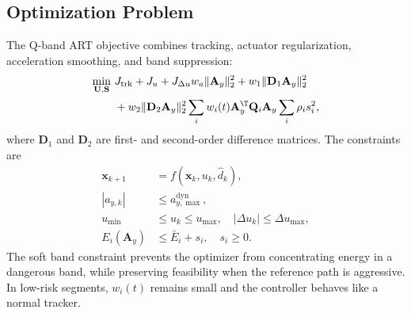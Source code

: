 \subsection{Optimization Problem}
The Q-band ART objective combines tracking, actuator regularization, acceleration smoothing, and band suppression:
\begin{equation}
\begin{aligned}
\min_{\mathbf{U},\mathbf{S}}~&
J_{\mathrm{trk}}+J_u+J_{\Delta u}
w_a\|\mathbf{A}_y\|_2^2+w_1\|\mathbf{D}_1\mathbf{A}_y\|_2^2\\
&+w_2\|\mathbf{D}_2\mathbf{A}_y\|_2^2
\sum_i w_i(t)\mathbf{A}_y^\T\mathbf{Q}_i\mathbf{A}_y
\sum_i\rho_i s_i^2 ,
\end{aligned}
\label{eq:qband_cost}
\end{equation}
where $\mathbf{D}_1$ and $\mathbf{D}_2$ are first- and second-order difference matrices. The constraints are
\begin{equation}
\begin{aligned}
    \mathbf{x}_{k+1}&=f(\mathbf{x}_k,u_k,\hat d_k),\\
    |a_{y,k}|&\leq a_{y,\max}^{\mathrm{dyn}},\\
    u_{\min}&\leq u_k\leq u_{\max},\quad |\Delta u_k|\leq \Delta u_{\max},\\
    E_i(\mathbf{A}_y)&\leq \bar{E}_i+s_i,\quad s_i\geq0 .
\end{aligned}
\label{eq:qband_constraints}
\end{equation}
The soft band constraint prevents the optimizer from concentrating energy in a dangerous band, while preserving feasibility when the reference path is aggressive. In low-risk segments, $w_i(t)$ remains small and the controller behaves like a normal tracker.

